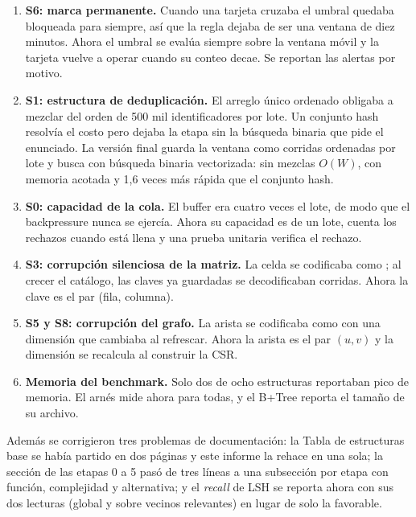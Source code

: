 \documentclass[11pt,letterpaper]{article}
\newcommand{\code}[1]{\texttt{\detokenize{#1}}}
\begin{document}
\begin{enumerate}[leftmargin=1.2em]
\item \textbf{S6: marca permanente.} Cuando una tarjeta cruzaba el umbral quedaba bloqueada para siempre, as\'i que la regla dejaba de ser una ventana de diez minutos. Ahora el umbral se eval\'ua siempre sobre la ventana m\'ovil y la tarjeta vuelve a operar cuando su conteo decae. Se reportan las alertas por motivo.
\item \textbf{S1: estructura de deduplicaci\'on.} El arreglo \'unico ordenado obligaba a mezclar del orden de 500 mil identificadores por lote. Un conjunto hash resolv\'ia el costo pero dejaba la etapa sin la b\'usqueda binaria que pide el enunciado. La versi\'on final guarda la ventana como corridas ordenadas por lote y busca con b\'usqueda binaria vectorizada: sin mezclas $O(W)$, con memoria acotada y 1,6 veces m\'as r\'apida que el conjunto hash.
\item \textbf{S0: capacidad de la cola.} El buffer era cuatro veces el lote, de modo que el backpressure nunca se ejerc\'ia. Ahora su capacidad es de un lote, cuenta los rechazos cuando est\'a llena y una prueba unitaria verifica el rechazo.
\item \textbf{S3: corrupci\'on silenciosa de la matriz.} La celda se codificaba como \code{fila*ncols+col}; al crecer el cat\'alogo, las claves ya guardadas se decodificaban corridas. Ahora la clave es el par (fila, columna).
\item \textbf{S5 y S8: corrupci\'on del grafo.} La arista se codificaba como \code{a*n+b} con una dimensi\'on que cambiaba al refrescar. Ahora la arista es el par $(u,v)$ y la dimensi\'on se recalcula al construir la CSR.
\item \textbf{Memoria del benchmark.} Solo dos de ocho estructuras reportaban pico de memoria. El arn\'es mide ahora \code{tracemalloc} para todas, y el B+Tree reporta el tama\~no de su archivo.
\end{enumerate}

Adem\'as se corrigieron tres problemas de documentaci\'on: la Tabla de estructuras base se hab\'ia partido en dos p\'aginas y este informe la rehace en una sola; la secci\'on de las etapas 0 a 5 pas\'o de tres l\'ineas a una subsecci\'on por etapa con funci\'on, complejidad y alternativa; y el \emph{recall} de LSH se reporta ahora con sus dos lecturas (global y sobre vecinos relevantes) en lugar de solo la favorable.
\end{document}
